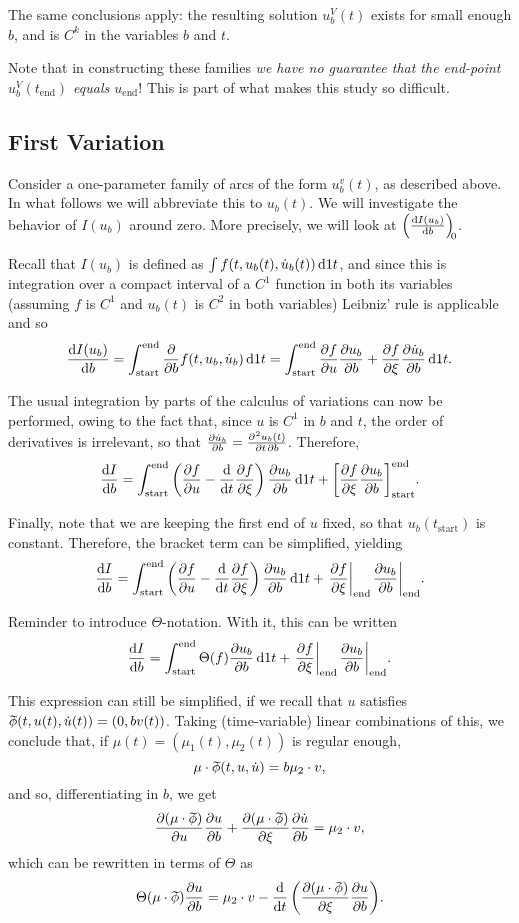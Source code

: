 \documentclass{article}
\theoremstyle{nonumberplain}
\theoremstyle{nonumberplain}
\newcommand{\tstart}{\mathrm{start}}
\newcommand{\tend}{\mathrm{end}}
\newcommand{\wtphi}{
  \mspace{2mu}
  \widetilde{\mspace{-2mu}\smash[t]{\phi}}
}
\DeclarePairedDelimiter\eval{.}{\rvert}
\DeclarePairedDelimiter\bracket{[}{]}
\begin{document}
The same conclusions apply: the resulting solution $u^V_b(t)$ exists for small enough $b$, and is $C^k$ in the variables $b$ and $t$.

Note that in constructing these families \emph{we have no guarantee that the end-point $u_b^V(t_\tend)$ equals $u_\tend$}! This is part of what makes this study so difficult.

\subsection{First Variation}

Consider a one-parameter family of arcs of the form $u_b^v(t)$, as described above. In what follows we will abbreviate this to $u_b(t)$. We will investigate the behavior of $I(u_b)$ around zero. More precisely, we will look at $\diff{I(u_b)}b[0]$.

Recall that $I(u_b)$ is defined as $\int f(t, u_b(t), \dot u_b(t)) \dl1 t$, and since this is integration over a compact interval of a $C^1$ function in both its variables (assuming $f$ is $C^1$ and $u_b(t)$ is $C^2$ in both variables) Leibniz' rule is applicable and so
\[\diff{I(u_b)}b = \int_\tstart^\tend \diffp*{f(t, u_b, \dot u_b)}b \dl1 t =\int_\tstart^\tend \diffp f u \diffp{u_b}b + \diffp f \xi \diffp{\dot u_b}b \dl1 t.\]

The usual integration by parts of the calculus of variations can now be performed, owing to the fact that, since $u$ is $C^1$ in $b$ and $t$, the order of derivatives is irrelevant, so that $\diffp{\dot u_b}b = \diffp{u_b(t)}{t,b}$. Therefore,
\[\diff I b = \int_\tstart^\tend \left( \diffp f u - \diff*{\diffp f \xi}t \right) \diffp{u_b}b \dl1 t + \bracket*{ \diffp f \xi \diffp{u_b}b }_\tstart^\tend.\]

Finally, note that we are keeping the first end of $u$ fixed, so that $u_b(t_\tstart)$ is constant. Therefore, the bracket term can be simplified, yielding
\[\diff I b = \int_\tstart^\tend \left( \diffp f u - \diff*{\diffp f \xi}t \right) \diffp{u_b}b \dl1 t + \eval*{\diffp f \xi}_\tend \eval*{\diffp{u_b}b}_\tend.\]

Reminder to introduce $\Theta$-notation. With it, this can be written
\[\diff I b = \int_\tstart^\tend \Theta(f) \diffp{u_b}b \dl1 t + \eval*{\diffp f \xi}_\tend \eval*{\diffp{u_b}b}_\tend.\]

This expression can still be simplified, if we recall that $u$ satisfies $\wtphi(t,u(t), \dot u(t)) = (0, b v(t))$. Taking (time-variable) linear combinations of this, we conclude that, if $\mu(t) = (\mu_1(t), \mu_2(t))$ is regular enough,
\[\mu \cdot \wtphi(t, u, \dot u) = b \mu_2 \cdot v,\]
and so, differentiating in $b$, we get
\[\diffp{(\mu \cdot \wtphi)}u \diffp u b + \diffp{(\mu \cdot \wtphi)}\xi \diffp{\dot u}b = \mu_2 \cdot v,\]
which can be rewritten in terms of $\Theta$ as
\[\Theta(\mu \cdot \wtphi) \diffp u b = \mu_2 \cdot v - \diff*{\left(\diffp{(\mu \cdot \wtphi)}\xi \diffp u b \right)}t.\]
\end{document}
